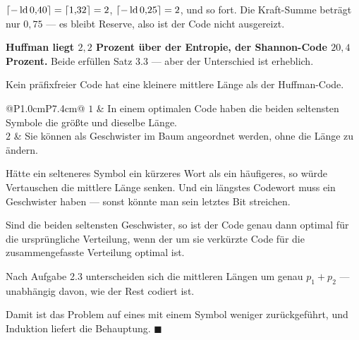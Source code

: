 \begin{merksatz}
 $\lceil-\operatorname{ld}0{,}40\rceil = \lceil1{,}32\rceil = 2$, $\lceil-\operatorname{ld}0{,}25\rceil = 2$, und so fort. Die Kraft-Summe beträgt nur $0{,}75$ --- es bleibt Reserve, also ist der Code nicht ausgereizt.

\begin{center}
\begin{minipage}{0.9\textwidth}
\textbf{Huffman liegt $2{,}2$ Prozent über der Entropie, der Shannon-Code $20{,}4$ Prozent.} Beide erfüllen Satz 3.3 --- aber der Unterschied ist erheblich.
\end{minipage}
\end{center}
\end{merksatz}

\begin{merksatz}
Kein präfixfreier Code hat eine kleinere mittlere Länge als der Huffman-Code.

\begin{center}
{\small
\renewcommand{\arraystretch}{1.52}
\begin{tabular}{@{}P{1.0cm}P{7.4cm}@{}}
\toprule
$1$ & In einem optimalen Code haben die beiden seltensten Symbole die größte und dieselbe Länge.\\
$2$ & Sie können als Geschwister im Baum angeordnet werden, ohne die Länge zu ändern.\\
\bottomrule
\end{tabular}}
\end{center}

 Hätte ein selteneres Symbol ein kürzeres Wort als ein häufigeres, so würde Vertauschen die mittlere Länge senken. Und ein längstes Codewort muss ein Geschwister haben --- sonst könnte man sein letztes Bit streichen.

Sind die beiden seltensten Geschwister, so ist der Code genau dann optimal für die ursprüngliche Verteilung, wenn der um sie verkürzte Code für die zusammengefasste Verteilung optimal ist.

 Nach Aufgabe 2.3 unterscheiden sich die mittleren Längen um genau $p_1+p_2$ --- unabhängig davon, wie der Rest codiert ist.

Damit ist das Problem auf eines mit einem Symbol weniger zurückgeführt, und Induktion liefert die Behauptung. $\blacksquare$

\begin{center}
\begin{minipage}{0.88\textwidth}
\end{minipage}
\end{center}
\end{merksatz}

